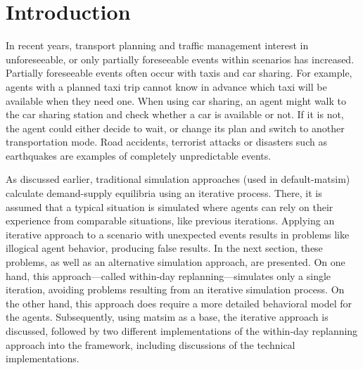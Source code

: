 
\section{Introduction}
In recent years, transport planning and traffic management interest in unforeseeable, or only partially foreseeable events within scenarios has increased. Partially foreseeable events often occur with taxis and car sharing. For example, agents with a planned taxi trip cannot know in advance which taxi will be available when they need one. When using car sharing, an agent might walk to the car sharing station and check whether a car is available or not. If it is not, the agent could either decide to wait, or change its plan and switch to another transportation mode. Road accidents, terrorist attacks or disasters such as earthquakes are examples of completely unpredictable events.

As discussed earlier, traditional simulation approaches (used in default-\gls{matsim}) calculate demand-supply equilibria using an iterative process. There, it is assumed that a typical situation is simulated where agents can rely on their experience from comparable situations, like previous iterations. Applying an iterative approach to a scenario with unexpected events results in problems like illogical agent behavior, producing false results. In the next section, these problems, as well as an alternative simulation approach, are presented. On one hand, this approach---called within-day replanning---simulates only a single iteration, avoiding problems resulting from an iterative simulation process. On the other hand, this approach does require a more detailed behavioral model for the agents. Subsequently, using \gls{matsim} as a base, the iterative approach is discussed, followed by two different implementations of the within-day replanning approach into the \gls{framework}, including discussions of the technical implementations.

